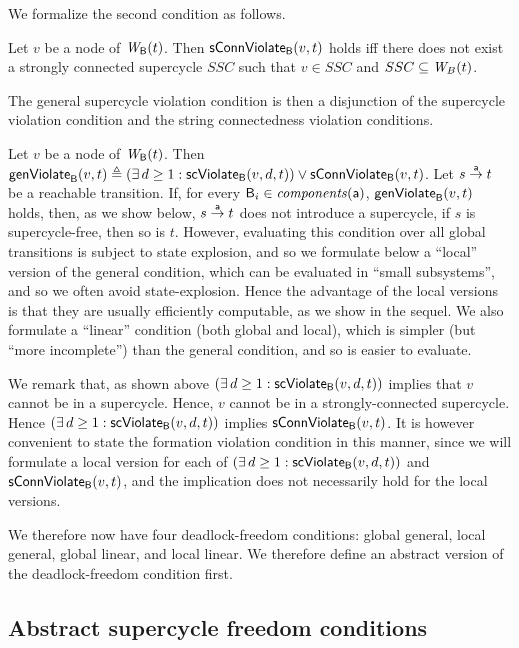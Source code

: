 We formalize the second condition as follows.

\label{def:sConn.violation}
 Let $v$ be a node of $\wfg{\B}{t}$.   Then $\connViol{v}{t}$ holds iff there does not exist a 
strongly connected
 supercycle $SSC$ such that $v \in SSC$ and $SSC \sub \wfg{B}{t}$.
\ed






The general supercycle violation condition is then a disjunction of the supercycle violation condition
and the string connectedness violation conditions.


\label{def:formation.violation} 
\label{defn:formation.violation} 
Let $v$ be a node of $\wfg{\B}{t}$.
Then $\genViol{v}{t}  \df (\exs d \ge 1: \scViol{v}{d}{t}) \lor \connViol{v}{t}$.
\ed
%
Let $s \goesto[\act] t$ be a reachable transition. If, for every $\B_i \in \cmps{\act}$,
$\formViol{v}{t}$ holds, then, as we show below, $s \goesto[\act] t$ does not introduce a
supercycle, \ie if $s$ is supercycle-free, then so is $t$.  However, evaluating this condition over
all global transitions is subject to state explosion, and so we formulate below a ``local'' version
of the general condition, which can be evaluated in ``small subsystems'', and so we often avoid
state-explosion. Hence the advantage of the local versions is that they are usually efficiently
computable, as we show in the sequel.  We also formulate a ``linear'' condition (both global and
local), which is simpler (but ``more incomplete'') than the general condition, and so is easier to
evaluate.

We remark that, as shown above $(\exs d \ge 1: \scViol{v}{d}{t})$ implies that $v$ cannot be in a
supercycle. Hence, $v$ cannot be in a strongly-connected supercycle.  Hence
$(\exs d \ge 1: \scViol{v}{d}{t})$ implies $\connViol{v}{t}$. It is however convenient to state the
formation violation condition in this manner, since we will formulate a local version
for each of $(\exs d \ge 1: \scViol{v}{d}{t})$ and $\connViol{v}{t}$, and the implication does not
necessarily hold for the local versions. 

We therefore now have four deadlock-freedom conditions: global general, local general, 
global linear, and local linear. We therefore define an abstract version of 
the deadlock-freedom condition first.


\subsection{Abstract supercycle freedom conditions}

